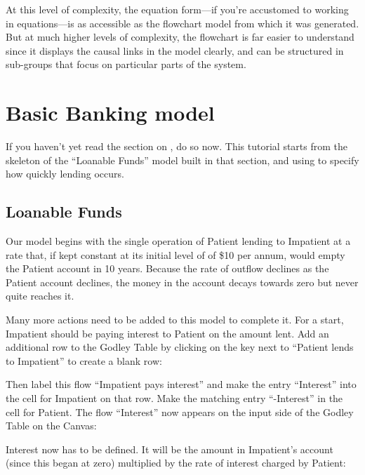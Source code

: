 At this level of complexity, the equation form---if you're accustomed
to working in equations---is as accessible as the flowchart model from
which it was generated. But at much higher levels of complexity, the
flowchart is far easier to understand since it displays the causal
links in the model clearly, and can be structured in sub-groups that
focus on particular parts of the system. 

\section{Basic Banking model}\label{tut:basicBankModel}

If you haven't yet read the section on , do so now. This tutorial starts from the
skeleton of the ``Loanable Funds'' model built in that section, and
using  to specify how quickly
lending occurs.  


\subsection{Loanable Funds}

Our model begins with the single operation of Patient lending to
Impatient at a rate that, if kept constant at its initial level of of
\$10 per annum, would empty the Patient account in 10 years. Because
the rate of outflow declines as the Patient account declines, the
money in the account decays towards zero but never quite reaches it.


Many more actions need to be added to this model to complete it. For a
start, Impatient should be paying interest to Patient on the amount
lent. Add an additional row to the Godley Table by clicking on the
 key
next to ``Patient lends to Impatient'' to create a blank row:


Then label this flow ``Impatient pays interest'' and make the entry
``Interest'' into the cell for Impatient on that row. Make the matching
entry ``-Interest'' in the cell for Patient. The flow ``Interest'' now
appears on the input side of the Godley Table on the Canvas: 


Interest now has to be defined. It will be the amount in Impatient's
account (since this began at zero) multiplied by the rate of interest
charged by Patient:

